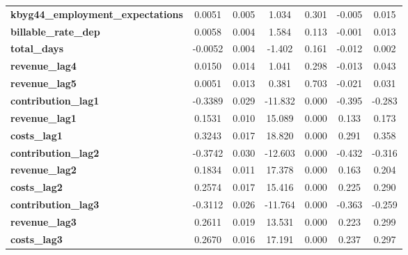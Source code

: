 \begin{center}
\begin{tabular}{lcccccc}
\textbf{kbyg44\_employment\_expectations} &       0.0051  &        0.005     &     1.034  &         0.301        &       -0.005    &        0.015     \\
\textbf{billable\_rate\_dep}              &       0.0058  &        0.004     &     1.584  &         0.113        &       -0.001    &        0.013     \\
\textbf{total\_days}                      &      -0.0052  &        0.004     &    -1.402  &         0.161        &       -0.012    &        0.002     \\
\textbf{revenue\_lag4}                    &       0.0150  &        0.014     &     1.041  &         0.298        &       -0.013    &        0.043     \\
\textbf{revenue\_lag5}                    &       0.0051  &        0.013     &     0.381  &         0.703        &       -0.021    &        0.031     \\
\textbf{contribution\_lag1}               &      -0.3389  &        0.029     &   -11.832  &         0.000        &       -0.395    &       -0.283     \\
\textbf{revenue\_lag1}                    &       0.1531  &        0.010     &    15.089  &         0.000        &        0.133    &        0.173     \\
\textbf{costs\_lag1}                      &       0.3243  &        0.017     &    18.820  &         0.000        &        0.291    &        0.358     \\
\textbf{contribution\_lag2}               &      -0.3742  &        0.030     &   -12.603  &         0.000        &       -0.432    &       -0.316     \\
\textbf{revenue\_lag2}                    &       0.1834  &        0.011     &    17.378  &         0.000        &        0.163    &        0.204     \\
\textbf{costs\_lag2}                      &       0.2574  &        0.017     &    15.416  &         0.000        &        0.225    &        0.290     \\
\textbf{contribution\_lag3}               &      -0.3112  &        0.026     &   -11.764  &         0.000        &       -0.363    &       -0.259     \\
\textbf{revenue\_lag3}                    &       0.2611  &        0.019     &    13.531  &         0.000        &        0.223    &        0.299     \\
\textbf{costs\_lag3}                      &       0.2670  &        0.016     &    17.191  &         0.000        &        0.237    &        0.297     \\

\end{tabular}
\end{center}
